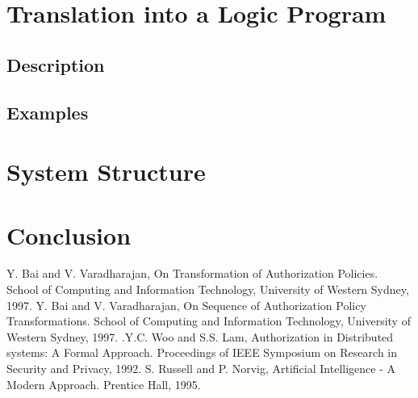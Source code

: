 \documentclass[a4paper]{article}
\begin{document}
  \section{Translation into a Logic Program}

    \subsection{Description}

    \subsection{Examples}

    \pagebreak

  \section{System Structure}

    \pagebreak

  \section{Conclusion}

    \pagebreak

  \begin{thebibliography}{}
    Y. Bai and V. Varadharajan, On Transformation of Authorization Policies. School of Computing and Information Technology, University of Western Sydney, 1997.
    Y. Bai and V. Varadharajan, On Sequence of Authorization Policy Transformations. School of Computing and Information Technology, University of Western Sydney, 1997.
    .Y.C. Woo and S.S. Lam, Authorization in Distributed systems: A Formal Approach. Proceedings of IEEE Symposium on Research in Security and Privacy, 1992.
    S. Russell and P. Norvig, Artificial Intelligence - A Modern Approach. Prentice Hall, 1995.
  \end{thebibliography}
\end{document}

